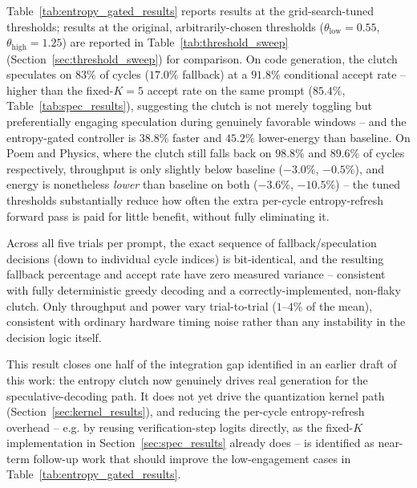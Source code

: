 \documentclass[10pt,journal,compsoc,twocolumn]{IEEEtran}
\begin{document}
Table~\ref{tab:entropy_gated_results} reports results at the grid-search-tuned thresholds; results at the original, arbitrarily-chosen thresholds ($\theta_{\text{low}}{=}0.55$, $\theta_{\text{high}}{=}1.25$) are reported in Table~\ref{tab:threshold_sweep} (Section~\ref{sec:threshold_sweep}) for comparison. On code generation, the clutch speculates on $83\%$ of cycles ($17.0\%$ fallback) at a $91.8\%$ conditional accept rate -- higher than the fixed-$K{=}5$ accept rate on the same prompt ($85.4\%$, Table~\ref{tab:spec_results}), suggesting the clutch is not merely toggling but preferentially engaging speculation during genuinely favorable windows -- and the entropy-gated controller is $38.8\%$ faster and $45.2\%$ lower-energy than baseline. On Poem and Physics, where the clutch still falls back on $98.8\%$ and $89.6\%$ of cycles respectively, throughput is only slightly below baseline ($-3.0\%$, $-0.5\%$), and energy is nonetheless \textit{lower} than baseline on both ($-3.6\%$, $-10.5\%$) -- the tuned thresholds substantially reduce how often the extra per-cycle entropy-refresh forward pass is paid for little benefit, without fully eliminating it.

Across all five trials per prompt, the exact sequence of fallback/speculation decisions (down to individual cycle indices) is bit-identical, and the resulting fallback percentage and accept rate have zero measured variance -- consistent with fully deterministic greedy decoding and a correctly-implemented, non-flaky clutch. Only throughput and power vary trial-to-trial ($1$--$4\%$ of the mean), consistent with ordinary hardware timing noise rather than any instability in the decision logic itself.

This result closes one half of the integration gap identified in an earlier draft of this work: the entropy clutch now genuinely drives real generation for the speculative-decoding path. It does not yet drive the quantization kernel path (Section~\ref{sec:kernel_results}), and reducing the per-cycle entropy-refresh overhead -- e.g. by reusing verification-step logits directly, as the fixed-$K$ implementation in Section~\ref{sec:spec_results} already does -- is identified as near-term follow-up work that should improve the low-engagement cases in Table~\ref{tab:entropy_gated_results}.
\end{document}
